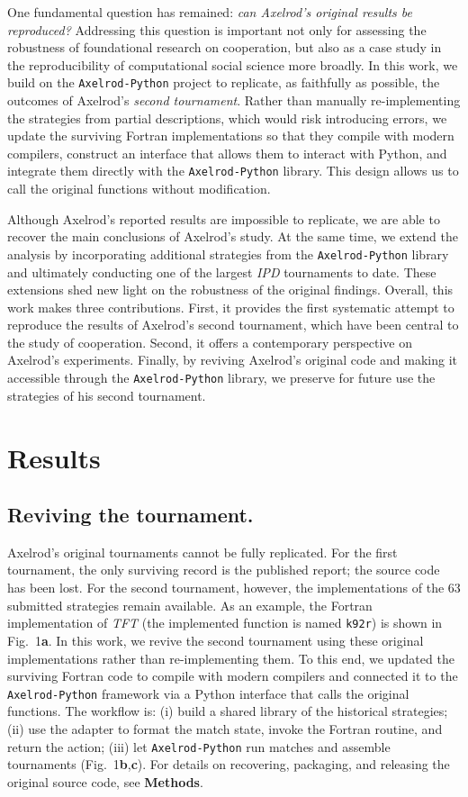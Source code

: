 \documentclass{article}
\newcommand{\TFT}{\emph{TFT}}
\newcommand{\IPD}{\emph{IPD}}
\newcommand{\AXL}{\texttt{Axelrod-Python}}
\begin{document}
One fundamental question has remained: \emph{can Axelrod's original results be
reproduced?} Addressing this question is important not only for assessing the
robustness of foundational research on cooperation, but also as a case study in
the reproducibility of computational social science more broadly. In this work, we
build on the \AXL{} project to replicate, as faithfully as possible, the
outcomes of Axelrod's \emph{second tournament}. Rather than manually
re-implementing the strategies from partial descriptions, which would risk
introducing errors, we update the surviving Fortran implementations so that they
compile with modern compilers, construct an interface that allows them to
interact with Python, and integrate them directly with the \AXL{} library. This
design allows us to call the original functions without modification.

Although Axelrod's reported results are impossible to replicate, we are able
to recover the main conclusions of Axelrod's study. At the same time, we extend
the analysis by incorporating additional strategies from the \AXL{}
library and ultimately conducting one of the largest \IPD{} tournaments to
date. These extensions shed new light on the robustness
of the original findings. Overall,
this work makes three contributions. First, it provides the first systematic
attempt to reproduce the results of Axelrod's second tournament, which have been
central to the study of cooperation. Second, it offers a contemporary
perspective on Axelrod's experiments. Finally, by reviving Axelrod's
original code and making it accessible through the \AXL{} library, we preserve
for future use the strategies of his second tournament.

\section*{Results}\label{sec:reviving}

\subsection*{Reviving the tournament.}

Axelrod's original tournaments cannot be fully replicated. For the first
tournament, the only surviving record is the published report; the source code
has been lost. For the second tournament, however, the implementations of the 63
submitted strategies remain available. As an example, the Fortran implementation
of \TFT{} (the implemented function is named \texttt{k92r}) is shown in
Fig.~1\textbf{a}. In this work, we revive the second
tournament using these original implementations rather than re-implementing
them. To this end, we updated the surviving Fortran code to compile with modern
compilers and connected it to the \AXL{} framework via a Python interface that
calls the original functions. The workflow is: (i) build a shared library of the
historical strategies; (ii) use the adapter to format the match state, invoke
the Fortran routine, and return the action; (iii) let \AXL{} run matches and
assemble tournaments (Fig.~1\textbf{b},\textbf{c}). For
details on recovering, packaging, and releasing the original source code, see
\textbf{Methods}.
\end{document}
